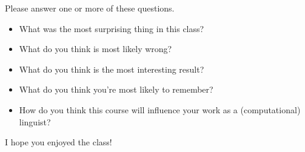\documentclass[a4paper,landscape,headrule,footrule]{foils}
\begin{document}

Please answer one or more of these questions.

\begin{itemize}
\item What was the most surprising thing in this 
class?
\item What do you think is most likely wrong?
\item What do you think is the most interesting result?
\item What do you think you’re most likely to remember?
\item How do you think this course will influence 
your work as a (computational) linguist?
\end{itemize}

I hope you enjoyed the class!
\end{document}
